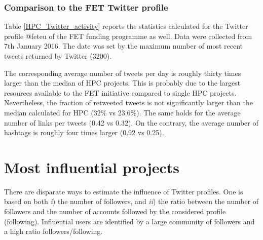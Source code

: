 \subsubsection{Comparison to the FET Twitter profile}
Table \ref{HPC_Twitter_activity} reports the statistics calculated for the Twitter profile @fet\textunderscore eu of the FET funding programme as well. Data were collected from 7th January 2016. The date was set by the maximum number of most recent tweets returned by Twitter (3200). 

The corresponding average number of tweets per day is roughly thirty times larger than the median of HPC projects. This is probably due to the largest resources available to the FET initiative compared to single HPC projects. Nevertheless, the fraction of retweeted tweets is not significantly larger than the median calculated for HPC (32\% vs 23.6\%). The same holds for the average number of links per tweets (0.42 vs 0.32). On the contrary, the average number of hashtags is roughly four times larger (0.92 vs 0.25).

\section{Most influential projects} \label{Most_influential_projects}
There are disparate ways to estimate the influence of Twitter profiles. One is based on both \textit{i}) the number of followers, and \textit{ii}) the ratio between the number of followers and the number of accounts followed by the considered profile (following). Influential users are identified by a large community of followers and a high ratio followers/following.

